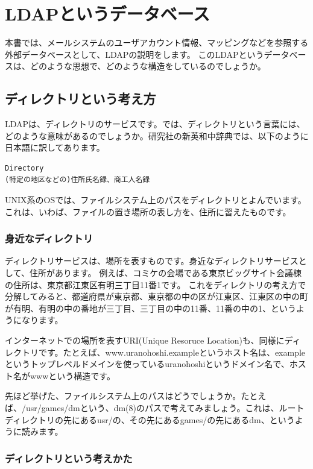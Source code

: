 \chapter{LDAPというデータベース}

本書では、メールシステムのユーザアカウント情報、マッピングなどを参照する外部データベースとして、LDAPの説明をします。
このLDAPというデータベースは、どのような思想で、どのような構造をしているのでしょうか。

\section{ディレクトリという考え方}

LDAPは、ディレクトリのサービスです。では、ディレクトリという言葉には、どのような意味があるのでしょうか。研究社の新英和中辞典では、以下のように日本語に訳してあります。

\begin{verbatim}
Directory
(特定の地区などの)住所氏名録、商工人名録
\end{verbatim}

UNIX系のOSでは、ファイルシステム上のパスをディレクトリとよんでいます。これは、いわば、ファイルの置き場所の表し方を、住所に習えたものです。

\subsection{身近なディレクトリ}

ディレクトリサービスは、場所を表すものです。身近なディレクトリサービスとして、住所があります。
例えば、コミケの会場である東京ビッグサイト会議棟の住所は、東京都江東区有明三丁目11番1です。
これをディレクトリの考え方で分解してみると、都道府県が東京都、東京都の中の区が江東区、江東区の中の町が有明、有明の中の番地が三丁目、三丁目の中の11番、11番の中の1、というようになります。

インターネットでの場所を表すURI(Unique Resoruce Location)も、同様にディレクトリです。たとえば、www.uranohoshi.exampleというホスト名は、exampleというトップレベルドメインを使っているuranohoshiというドメイン名で、ホスト名がwwwという構造です。

先ほど挙げた、ファイルシステム上のパスはどうでしょうか。たとえば、/usr/games/dmという、dm(8)のパスで考えてみましょう。これは、ルートディレクトリの先にあるusr/の、その先にあるgames/の先にあるdm、というように読みます。

\subsection{ディレクトリという考えかた}

